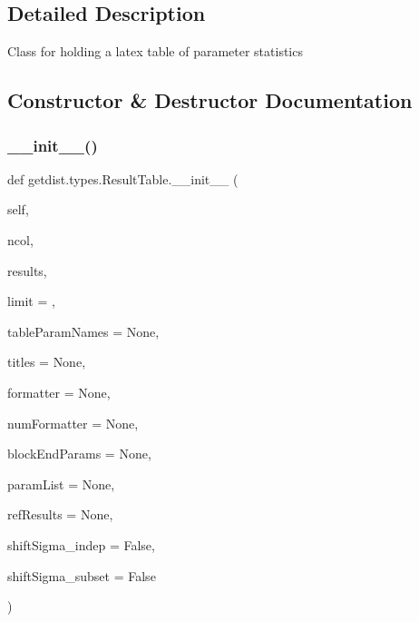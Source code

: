\subsection{Detailed Description}
\begin{DoxyVerb}Class for holding a latex table of parameter statistics
\end{DoxyVerb}
 

\subsection{Constructor \& Destructor Documentation}
\mbox{\label{classgetdist_1_1types_1_1ResultTable_abb0448cf00e3aa3b9f5457be49cd7c4d}} 
\subsubsection{\texorpdfstring{\+\_\+\+\_\+init\+\_\+\+\_\+()}{\_\_init\_\_()}}
{\footnotesize\ttfamily def getdist.\+types.\+Result\+Table.\+\_\+\+\_\+init\+\_\+\+\_\+ (\begin{DoxyParamCaption}\item[{}]{self,  }\item[{}]{ncol,  }\item[{}]{results,  }\item[{}]{limit = {},  }\item[{}]{table\+Param\+Names = {\ttfamily None},  }\item[{}]{titles = {\ttfamily None},  }\item[{}]{formatter = {\ttfamily None},  }\item[{}]{num\+Formatter = {\ttfamily None},  }\item[{}]{block\+End\+Params = {\ttfamily None},  }\item[{}]{param\+List = {\ttfamily None},  }\item[{}]{ref\+Results = {\ttfamily None},  }\item[{}]{shift\+Sigma\+\_\+indep = {\ttfamily False},  }\item[{}]{shift\+Sigma\+\_\+subset = {\ttfamily False} }\end{DoxyParamCaption})}

